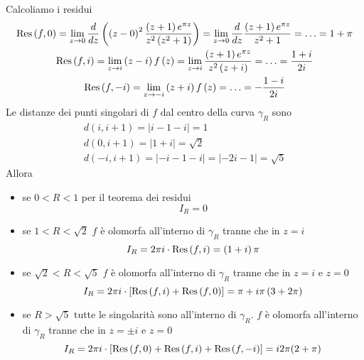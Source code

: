 Calcoliamo i residui
\begin{gather*}
\operatorname{Res} \left(f,0\right) = \lim _{z\rightarrow 0}\frac{d}{dz}\left(\left(z - 0\right)^{2}\frac{\left(z + 1\right) e^{\pi z}}{z^{2}\left(z^{2} + 1\right)}\right) = \lim _{z\rightarrow 0}\frac{d}{dz}\frac{\left(z + 1\right) e^{\pi z}}{z^{2} + 1} = \dotsc = 1 + \pi \\
\operatorname{Res} \left(f,i\right) = \lim _{z\rightarrow i}\left(z - i\right) f\left(z\right) = \lim _{z\rightarrow i}\frac{\left(z + 1\right) e^{\pi z}}{z^{2}\left(z + i\right)} = \dotsc = \frac{1 + i}{2i}\\
\operatorname{Res} \left(f, - i\right) = \lim _{z\rightarrow - i}\left(z + i\right) f\left(z\right) = \dotsc = - \frac{1 - i}{2i}
\end{gather*}
Le distanze dei punti singolari di $f$ dal centro della curva $\gamma _{R}$ sono
\begin{gather*}
d\left(i,i + 1\right) = \left| i - 1 - i\right| = 1\\
d\left(0,i + 1\right) = \left| 1 + i\right| = \sqrt{2}\\
d\left(- i,i + 1\right) = \left| - i - 1 - i\right| = \left| - 2i - 1\right| = \sqrt{5}
\end{gather*}
Allora
\begin{itemize}
\item se $0 < R < 1$ per il teorema dei residui\begin{equation*}
I_{R} = 0
\end{equation*}
\item se $1 < R < \sqrt{2}$ $f$ è olomorfa all'interno di $\gamma _{R}$ tranne che in $z = i$\begin{equation*}
I_{R} = 2\pi i\cdot \operatorname{Res} \left(f,i\right) = \left(1 + i\right) \pi 
\end{equation*}
\item se $\sqrt{2} < R < \sqrt{5}$ $f$ è olomorfa all'interno di $\gamma _{R}$ tranne che in $z = i$ e $z = 0$\begin{equation*}
I_{R} = 2\pi i\cdot \left[\operatorname{Res} \left(f,i\right) + \operatorname{Res} \left(f,0\right)\right] = \pi + i\pi \left(3 + 2\pi\right)
\end{equation*}
\item se $R > \sqrt{5}$ tutte le singolarità sono all'interno di $\gamma _{R}$. $f$ è olomorfa all'interno di $\gamma _{R}$ tranne che in $z = \pm i$ e $z = 0$\begin{equation*}
I_{R} = 2\pi i\cdot \left[\operatorname{Res} \left(f,0\right) + \operatorname{Res} \left(f,i\right) + \operatorname{Res} \left(f, - i\right)\right] = i2\pi (2 + \pi)
\end{equation*}
\end{itemize}

